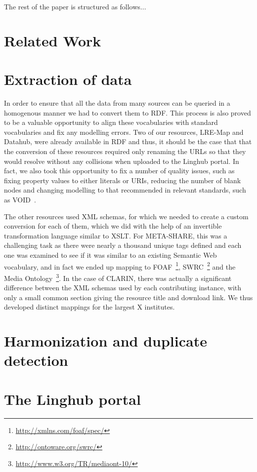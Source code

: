 \documentclass[11pt]{article}
\begin{document}
The rest of the paper is structured as follows...

\section{Related Work}

\section{Extraction of data}

In order to ensure that all the data from many sources can be queried in a
homogenous manner we had to convert them to RDF. This process is also proved to
be a valuable opportunity to align these vocabularies with standard vocabularies
and fix any modelling errors. Two of our resources, LRE-Map and Datahub, were already available in RDF
and thus, it should be the case that that the conversion of these resources
required only renaming the URLs so that they would resolve without any
collisions when uploaded to the Linghub portal. In fact, we also took this
opportunity to fix a number of quality issues, such as fixing property values to
either literals or URIs, reducing the number of blank nodes and changing
modelling to that recommended in relevant standards, such as
VOID~\cite{alexander2011describing}. 

The other resources used XML schemas, for which we needed to create a custom
conversion for each of them, which we did with the help of an invertible
transformation language similar to XSLT. For META-SHARE, this was a challenging
task as there were nearly a thousand unique tags defined and each one was
examined to see if it was similar to an existing Semantic Web vocabulary, and in
fact we ended up mapping to FOAF~\footnote{\url{http://xmlns.com/foaf/spec/}},
SWRC~\footnote{\url{http://ontoware.org/swrc/}} and the Media
Ontology~\footnote{\url{http://www.w3.org/TR/mediaont-10/}}. In the case of
CLARIN, there was actually a significant difference between the XML schemas used
by each contributing instance, with only a small common section giving the
resource title and download link. We thus developed distinct mappings for the
largest X institutes.

\section{Harmonization and duplicate detection}

\section{The Linghub portal}
\end{document}
